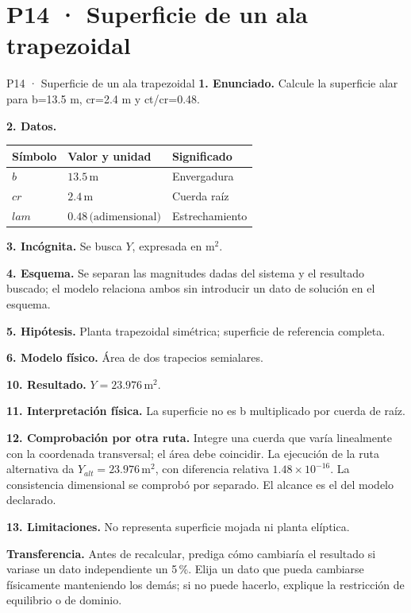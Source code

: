 \chapter*{P14 · Superficie de un ala trapezoidal}
\begin{studiumworked}{P14 · Superficie de un ala trapezoidal}
\textbf{1. Enunciado.} Calcule la superficie alar para b=13.5 m, cr=2.4 m y ct/cr=0.48.

\textbf{2. Datos.}
\begin{longtable}{p{.16\linewidth}p{.35\linewidth}p{.38\linewidth}}\toprule Símbolo & Valor y unidad & Significado\\\midrule\endhead
$b$ & $13.5\,\mathrm m$ & Envergadura\\
$cr$ & $2.4\,\mathrm m$ & Cuerda raíz\\
$lam$ & $0.48\,\text{(adimensional)}$ & Estrechamiento\\
\bottomrule\end{longtable}
\textbf{3. Incógnita.} Se busca $Y$, expresada en $\mathrm{m^2}$.

\textbf{4. Esquema.} Se separan las magnitudes dadas del sistema y el resultado buscado; el modelo relaciona ambos sin introducir un dato de solución en el esquema.

\textbf{5. Hipótesis.} Planta trapezoidal simétrica; superficie de referencia completa.

\textbf{6. Modelo físico.} Área de dos trapecios semialares.


\textbf{10. Resultado.} $Y=23.976\,\mathrm{m^2}$.

\textbf{11. Interpretación física.} La superficie no es b multiplicado por cuerda de raíz.

\textbf{12. Comprobación por otra ruta.} Integre una cuerda que varía linealmente con la coordenada transversal; el área debe coincidir. La ejecución de la ruta alternativa da $Y_{alt}=23.976\,\mathrm{m^2}$, con diferencia relativa $1.48\times10^{-16}$. La consistencia dimensional se comprobó por separado. El alcance es el del modelo declarado.

\textbf{13. Limitaciones.} No representa superficie mojada ni planta elíptica.

\textbf{Transferencia.} Antes de recalcular, prediga cómo cambiaría el resultado si variase un dato independiente un 5\,\%. Elija un dato que pueda cambiarse físicamente manteniendo los demás; si no puede hacerlo, explique la restricción de equilibrio o de dominio.\par
\end{studiumworked}
